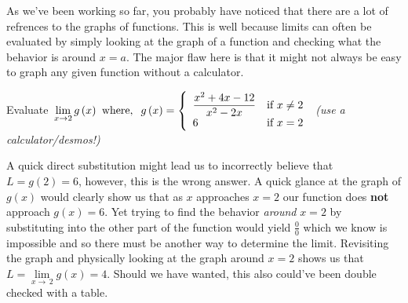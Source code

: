 \documentclass[addpoints]{exam}
\begin{document}
  \newpage 

  \begin{tcolorbox}[breakable, title=GRAPHICALLY, colframe=black, sharp corners, colback=white, colbacktitle=white, coltitle=black]
    As we've been working so far, you probably have noticed that there are a lot of refrences to the graphs of functions. This is well because limits can often be evaluated by simply looking at the graph of a function and checking what the behavior is around $x=a$. The major flaw here is that it might not always be easy to graph any given function without a calculator.
  \end{tcolorbox}

  \begin{questions}
    \question Evaluate $\displaystyle\,\mathop {\lim }\limits_{x \to 2} g\left( x \right)\hspace{0.05in}{\mbox{where,}}\hspace{0.1in}g\left( x \right) = \left\{ \begin{array}{ll}\displaystyle \frac{{{x^2} + 4x - 12}}{{{x^2} - 2x}} & {\mbox{if }}x \ne 2\\ 6 & {\mbox{if }}x = 2\end{array} \right.$ \small\textit{(use a calculator/desmos!)}\normalsize
    \begin{solution}[2.5in]
      \begin{minipage}{0.45\linewidth}
        A quick direct substitution might lead us to incorrectly believe that $L=g(2)=6$, however, this is the wrong answer. A quick glance at the graph of $g(x)$ would clearly show us that as $x$ approaches $x=2$ our function does \textbf{not} approach $g(x)=6$. Yet trying to find the behavior \textit{around} $x=2$ by substituting into the other part of the function would yield $\frac{0}{0}$ which we know is impossible and so there must be another way to determine the limit. Revisiting the graph and physically looking at the graph around $x=2$ shows us that $L=\lim\limits_{x\to\,2} g(x) = 4$. Should we have wanted, this also could've been double checked with a table. 
      \end{minipage}
      \hfill 
      \begin{minipage}{0.45\linewidth}
      \end{minipage}
    \end{solution}
  \end{questions}
\end{document}
